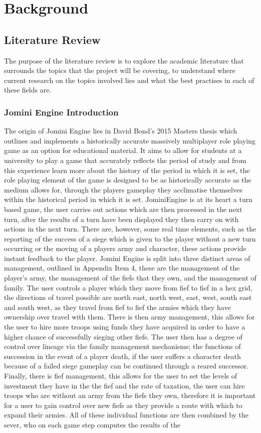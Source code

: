 \documentclass{article}
\begin{document}
	\section{Background}
	\subsection{Literature Review}
	The purpose of the literature review is to explore the academic literature that surrounds the topics that the project will be covering, to understand where current research on the topics involved lies and what the best practises in each of these fields are.
	\subsubsection{Jomini Engine Introduction}
	The origin of Jomini Engine lies in David Bond's 2015 Masters thesis\cite{DavidBond} which outlines and implements a historically accurate massively multiplayer role playing game as an option for educational material. It aims to allow for students at a university to play a game that accurately reflects the period of study and from this experience learn more about the history of the period in which it is set, the role playing element of the game is designed to be as historically accurate as the medium allows for,  through the players gameplay they acclimatise themselves within the historical period in which it is set. JominiEngine is at its heart a turn based game, the user carries out actions which are then processed in the next turn, after the results of a turn have been displayed they then carry on with actions in the next turn. There are, however, some real time elements, such as the reporting of the success of a siege which is given to the player without a new turn occurring or the moving of a players army and character, these actions provide instant feedback to the player. Jomini Engine is split into three distinct areas of management, outlined in Appendix Item 4, these are the management of the player's army, the management of the fiefs that they own, and the management of family. The user controls a player which they move from fief to fief in a hex grid, the directions of travel possible are north east, north west, east, west, south east and south west, as they travel from fief to fief the armies which they have ownership over travel with them. There is then army management, this allows for the user to hire more troops using funds they have acquired in order to have a higher chance of successfully sieging other fiefs. The user then has a degree of control over lineage via the family management mechanisms; the functions of succession in the event of a player death, if the user suffers a character death because of a failed siege gameplay can be continued through a reared successor. Finally, there is fief management, this allows for the user to set the levels of investment they have in the the fief and the rate of taxation, the user can hire troops who are without an army from the fiefs they own, therefore it is important for a user to gain control over new fiefs as they provide a route with which to expand their armies. All of these individual functions are then combined by the sever, who on each game step computes the results of the 
\end{document}
